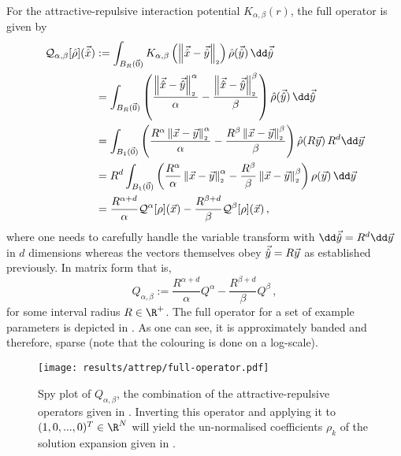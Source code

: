 For the attractive-repulsive interaction potential $K_{\alpha,\beta}(r)$, the full operator is given by
\begin{align*}
  \mathcal{Q}_{\alpha, \beta}[\hat{\rho}](\hatvec{x}) & := \int_{B_R(\vec{0})} K_{\alpha,\beta}\left(\norm{\hatvec{x} - \hatvec{y}}\right) \hat{\rho}(\hatvec{y}) \,\dd\hatvec{y}                                                               \\
                                                      & = \int_{B_R(\vec{0})} \left(\frac{\norm{\hatvec{x} - \hatvec{y}}^\alpha}{\alpha} - \frac{\norm{\hatvec{x} - \hatvec{y}}^\beta}{\beta}\right) \hat{\rho}(\hatvec{y}) \,\dd\hatvec{y}     \\
                                                      & = \int_{B_1(\vec{0})} \left(\frac{R^\alpha \norm{\vec{x} - \vec{y}}^\alpha}{\alpha} - \frac{R^\beta \norm{\vec{x} - \vec{y}}^\beta}{\beta}\right) \hat{\rho}(R\vec{y}) \, R^d\dd\vec{y} \\
                                                      & = R^d\int_{B_1(\vec{0})} \left(\frac{R^\alpha}{\alpha}\norm{\vec{x} - \vec{y}}^\alpha - \frac{R^\beta}{\beta} \norm{\vec{x} - \vec{y}}^\beta\right) \rho(\vec{y}) \,\dd\vec{y}          \\
                                                      & = \frac{R^{\alpha+d}}{\alpha} \mathcal{Q}^\alpha[\rho](\vec{x}) - \frac{R^{\beta+d}}{\beta} \mathcal{Q}^\beta[\rho](\vec{x})\,,
\end{align*}
where one needs to carefully handle the variable transform with $\dd\hatvec{y} = R^d \dd\vec{y}$ in $d$ dimensions whereas the vectors themselves obey $\vec{\hat{y}} = R \vec{y}$ as established previously.
In matrix form that is,
\begin{equation}
  Q_{\alpha, \beta} := \frac{R^{\alpha+d}}{\alpha} Q^\alpha - \frac{R^{\beta+d}}{\beta} Q^\beta\,,
  \label{eq:full-attrep-operator}
\end{equation}
for some interval radius $R \in \R^+$.
The full operator for a set of example parameters is depicted in .
As one can see, it is approximately banded and therefore, sparse (note that the colouring is done on a log-scale).

\begin{figure}[H]
  \centering
  \texttt{[image: results/attrep/full-operator.pdf]}
  \caption[Combination of the attractive-repulsive operators]{Spy plot of $Q_{\alpha, \beta}$, the combination of the attractive-repulsive operators given in . Inverting this operator and applying it to $(1, 0, ..., 0)^T \in \R^N$ will yield the un-normalised coefficients $\rho_k$ of the solution expansion given in .}
  \label{fig:attrep-operator}
\end{figure}
